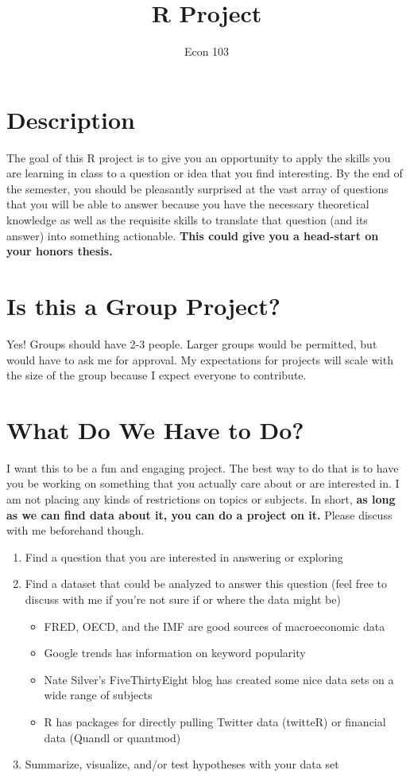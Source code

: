 \documentclass[10pt,letterpaper]{article}
\title{R Project}
\author{Econ 103}
\date{}
\begin{document}
\maketitle

\section{Description}
The goal of this R project is to give you an opportunity to apply the skills you are learning in class to a question or idea that you find interesting. By the end of the semester, you should be pleasantly surprised at the vast array of questions that you will be able to answer because you have the necessary theoretical knowledge as well as the requisite skills to translate that question (and its answer) into something actionable. \textbf{This could give you a head-start on your honors thesis.}

\section{Is this a Group Project?}
Yes! Groups should have 2-3 people. Larger groups would be permitted, but would have to ask me for approval. My expectations for projects will scale with the size of the group because I expect everyone to contribute. 

\section{What Do We Have to Do?}
I want this to be a fun and engaging project. The best way to do that is to have you be working on something that you actually care about or are interested in. I am not placing any kinds of restrictions on topics or subjects. In short, \textbf{as long as we can find data about it, you can do a project on it. } Please discuss with me beforehand though. 

\begin{enumerate}
	\item Find a question that you are interested in answering or exploring
	\item Find a dataset that could be analyzed to answer this question (feel free to discuss with me if you're not sure if or where the data might be)
	\begin{itemize}
		\item FRED, OECD, and the IMF are good sources of macroeconomic data
		\item Google trends has information on keyword popularity
		\item Nate Silver's FiveThirtyEight blog has created some nice data sets on a wide range of subjects
		\item R has packages for directly pulling Twitter data (twitteR) or financial data (Quandl or quantmod)
	\end{itemize}
	\item Summarize, visualize, and/or test hypotheses with your data set
\end{enumerate}
\end{document}
